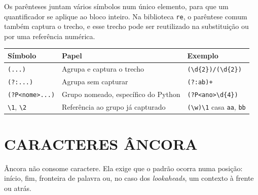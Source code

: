 \documentclass[
    12pt,
    oneside,
    a4paper,
    chapter=TITLE,
    section=TITLE,
    sumario=abnt-6027-2012
]{abntex2}
\begin{document}
Os parênteses juntam vários símbolos num único elemento, para que um quantificador se aplique ao bloco inteiro. Na biblioteca \texttt{re}, o parêntese comum também captura o trecho, e esse trecho pode ser reutilizado na substituição ou por uma referência numérica.

\begin{quadro}[!h]
    \centering
    \small
    \begin{tabular}{|p{3.3cm}|p{5.2cm}|p{5.2cm}|}
        \hline
        \textbf{Símbolo} & \textbf{Papel} & \textbf{Exemplo} \\
        \hline
        \hline
        \verb|(...)| & Agrupa e captura o trecho & \verb|(\d{2})/(\d{2})| \\
        \hline
        \verb|(?:...)| & Agrupa sem capturar & \verb|(?:ab)+| \\
        \hline
        \verb|(?P<nome>...)| & Grupo nomeado, específico do Python & \verb|(?P<ano>\d{4})| \\
        \hline
        \verb|\1|, \verb|\2| & Referência ao grupo já capturado & \verb|(\w)\1| casa \texttt{aa}, \texttt{bb} \\
        \hline
    \end{tabular}
    \fonteautoria
\end{quadro}

\section{CARACTERES ÂNCORA}
\label{sec:ancoras}

Âncora não consome caractere. Ela exige que o padrão ocorra numa posição: início, fim, fronteira de palavra ou, no caso dos \textit{lookaheads}, um contexto à frente ou atrás.
\end{document}
